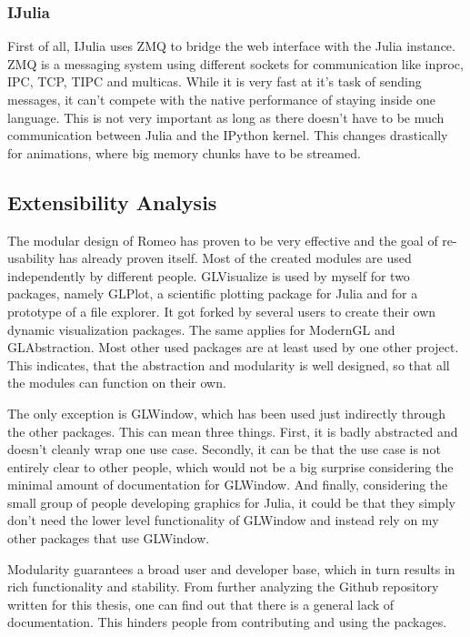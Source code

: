 \subsubsection{IJulia}
First of all, IJulia uses ZMQ to bridge the web interface with the Julia instance.
ZMQ is a messaging system using different sockets for communication like inproc, IPC, TCP, TIPC and multicas.
While it is very fast at it's task of sending messages, it can't compete with the native performance of staying inside one language.
This is not very important as long as there doesn't have to be much communication between Julia and the IPython kernel. This changes drastically for animations, where big memory chunks have to be streamed.



\subsection{Extensibility Analysis}

The modular design of Romeo has proven to be very effective and the goal of re-usability has already proven itself.
Most of the created modules are used independently by different people.
GLVisualize is used by myself for two packages, namely GLPlot, a scientific plotting package for Julia and for a prototype of a file explorer. 
It got forked by several users to create their own dynamic visualization packages.
The same applies for ModernGL and GLAbstraction. Most other used packages are at least used by one other project.
This indicates, that the abstraction and modularity is well designed, so that all the modules can function on their own.

The only exception is GLWindow, which has been used just indirectly through the other packages. 
This can mean three things.
First, it is badly abstracted and doesn't cleanly wrap one use case.
Secondly, it can be that the use case is not entirely clear to other people, which would not be a big surprise considering the minimal amount of documentation for GLWindow.
And finally, considering the small group of people developing graphics for Julia, it could be that they simply don't need the lower level functionality of GLWindow and instead rely on my other packages that use GLWindow.

Modularity guarantees a broad user and developer base, which in turn results in rich functionality and stability.
From further analyzing the Github repository written for this thesis, one can find out that there is a general lack of documentation.
This hinders people from contributing and using the packages.

